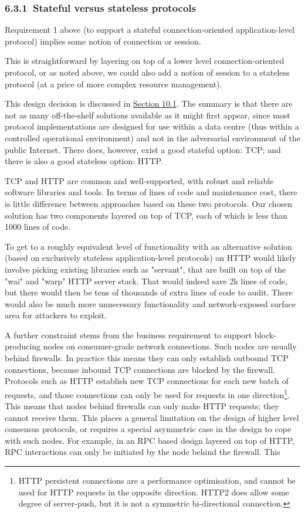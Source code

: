 \documentclass[11pt,a4paper]{article}
\begin{document}
\hypertarget{stateful-versus-stateless-protocols}{%
\subsubsection{​6.3.1​~Stateful versus stateless
protocols}\label{stateful-versus-stateless-protocols}}

Requirement 1 above (to support a stateful connection-oriented
application-level protocol) implies some notion of connection or
session.

This is straightforward by layering on top of a lower level
connection-oriented protocol, or as noted above, we could also add a
notion of session to a stateless protocol (at a price of more complex
resource management).

This design decision is discussed in
\protect\hyperlink{stateful-implementation}{{Section 10.1}}. The summary
is that there are not as many off-the-shelf solutions available as it
might first appear, since most protocol implementations are designed for
use within a data centre (thus within a controlled operational
environment) and not in the adversarial environment of the public
Internet. There does, however, exist a good stateful option: TCP; and
there is also a good stateless option: HTTP.

TCP and HTTP are common and well-supported, with robust and reliable
software libraries and tools. In terms of lines of code and maintenance
cost, there is little difference between approaches based on these two
protocols. Our chosen solution has two components layered on top of TCP,
each of which is less than 1000 lines of code.

To get to a roughly equivalent level of functionality with an
alternative solution (based on exclusively stateless application-level
protocols) on HTTP would likely involve picking existing libraries such
as "servant", that are built on top of the "wai" and "warp" HTTP server
stack. That would indeed save 2k lines of code, but there would then be
tens of thousands of extra lines of code to audit. There would also be
much more unnecessary functionality and network-exposed surface area for
attackers to exploit.

A further constraint stems from the business requirement to support
block-producing nodes on consumer-grade network connections. Such nodes
are usually behind firewalls. In practice this means they can only
establish outbound TCP connections, because inbound TCP connections are
blocked by the firewall. Protocols such as HTTP establish new TCP
connections for each new batch of requests, and those connections can
only be used for requests in one direction\footnote{HTTP persistent
  connections are a performance optimisation, and cannot be used for
  HTTP requests in the opposite direction. HTTP2 does allow some degree
  of server-push, but it is not a symmetric bi-directional connection.}.
This means that nodes behind firewalls can only make HTTP requests; they
cannot receive them. This places a general limitation on the design of
higher level consensus protocols, or requires a special asymmetric case
in the design to cope with such nodes. For example, in an RPC based
design layered on top of HTTP, RPC interactions can only be initiated by
the node behind the firewall. This
\end{document}

